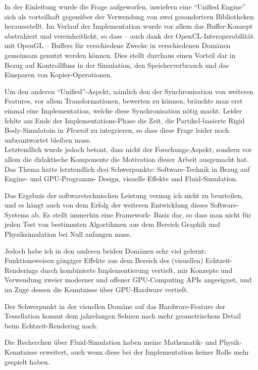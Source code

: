 
\label{sec:Fazit}

In der Einleitung wurde die Frage aufgeworfen, inwiefern eine "`Unified Engine"' sich als vorteilhaft
gegenüber der Verwendung von zwei gesondertern Bibliotheken heraussstellt.
Im Verlauf der Implementation wurde vor allem das Buffer-Konzept abstrahiert und vereinheitlicht,
so dass -- auch dank der OpenCL-Interoperabilität mit OpenGL -- Buffers für verschiedene Zwecke
in verschiedenen Domänen gemeinsam genutzt werden können. Dies stellt durchaus einen Vorteil dar
in Bezug auf Kontrollfluss in der Simulation, den Speicherverbrauch und das Einsparen von Kopier-Operationen.

Um den anderen "`Unified"'-Aspekt, nämlich den der Synchronisation von weiteren Features, vor allem
Transformationen, bewerten zu können,
bräuchte man erst einmal eine Implementation, welche diese Synchronisation nötig macht. Leider fehlte am Ende
der Implementations-Phase die Zeit, die Partikel-basierte Rigid Body-Simulatoin in \emph{Flewnit}
zu integrieren, so dass diese Frage leider noch unbeantwortet bleiben muss.\\

Letztendlich wurde jedoch betont, dass nicht der Forschungs-Aspekt, sondern vor allem die didaktische Komponente
die Motivation dieser Arbeit ausgemacht hat. Das Thema hatte letztendlich drei Schwerpunkte: 
Software-Technik in Bezug auf Engine- und GPU-Programm- Design, visuelle Effekte und Fluid-Simulation.

Das Ergebnis der softwaretechnischen Leistung vermag ich nicht zu beurteilen, und es hängt auch von dem
Erfolg der weiteren Entwicklung dieses Software-Systems ab. Es stellt immerhin eine Framework- Basis dar, 
so dass man nicht für jeden Test von bestimmten Algortihmen aus dem Bereich Graphik und Physiksimulation 
bei Null anfangen muss.

Jedoch habe ich in den anderen beiden Domänen sehr viel gelernt:
Funktionsweisen gängiger Effekte aus dem Bereich des (visuellen) Echtzeit-Renderings durch kombinierte Implementierung vertieft, mir Konzepte und Verwendung zweier moderner und offener GPU-Computing APIs angeeignet, und im
Zuge dessen die Kenntnisse über GPU-Hardware vertieft.

Der Schwerpunkt in der visuellen Domäne auf das Hardware-Feature der Tessellation kommt dem jahrelangen Sehnen
nach mehr geometrischem Detail beim Echtzeit-Rendering nach.

Die Recherchen über Fluid-Simulation haben meine Mathematik- und Physik-Kenntnisse erweitert, auch wenn diese bei der Implementation keiner Rolle mehr gespielt haben.

